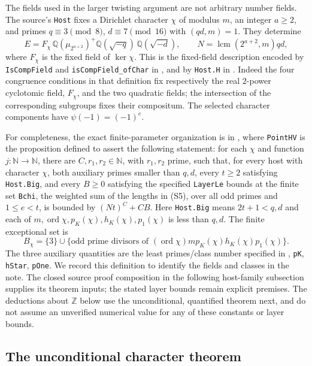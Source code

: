 \documentclass[11pt,a4paper]{article}
\theoremstyle{definition}
\begin{document}
The fields used in the larger twisting argument are not arbitrary number
fields. The source's \texttt{Host} fixes a Dirichlet character $\chi$ of
modulus $m$, an integer $a\ge2$, and primes $q\equiv3\pmod8$,
$d\equiv7\pmod{16}$ with $(qd,m)=1$. They determine
\[
 E=F_\chi\,\mathbb Q(\mu_{2^{a+2}})^+
      \mathbb Q(\sqrt{-q})\,\mathbb Q(\sqrt{-d}),
 \qquad N=\operatorname{lcm}(2^{a+2},m)qd,
 \tag{S6}
\]
where $F_\chi$ is the fixed field of $\ker\chi$. This is the fixed-field
description encoded by \texttt{IsCompField} and
\texttt{isCompField\_ofChar} in , and by
\texttt{Host.H} in
.
Indeed the four congruence conditions in that definition fix respectively
the real $2$-power cyclotomic field, $F_\chi$, and the two quadratic fields;
the intersection of the corresponding subgroups fixes their compositum.
The selected character components have $\psi(-1)=(-1)^e$.

For completeness, the exact finite-parameter organization is in
, where \texttt{PointHV}
is the proposition defined to assert the following statement:
for each $\chi$ and function $j:\mathbb N\to\mathbb N$, there are
$C,r_1,r_2\in\mathbb N$, with $r_1,r_2$ prime, such that, for every host
with character $\chi$, both auxiliary primes smaller than $q,d$, every
$t\ge2$ satisfying \texttt{Host.Big}, and every $B\ge0$ satisfying
the specified \texttt{LayerLe} bounds at the finite set \texttt{Bchi},
the weighted sum of the lengths in (S5), over all odd primes and
$1\le e<t$, is bounded by $(Nt)^C+CB$.
Here \texttt{Host.Big} means $2t+1<q,d$ and each of
$m,\operatorname{ord}\chi,p_K(\chi),h_K(\chi),p_1(\chi)$ is less than
$q,d$. The finite exceptional set is
\[
 B_\chi=\{3\}\cup
 \{\text{odd prime divisors of }
   (\operatorname{ord}\chi)m p_K(\chi)h_K(\chi)p_1(\chi)\}.
\]
The three auxiliary quantities are the least primes/class number specified
in , \texttt{pK}, \texttt{hStar}, \texttt{pOne}.
We record this definition to identify the fields and classes in the
note. The closed source proof composition in the following host-family
subsection supplies its theorem inputs; the stated layer bounds remain
explicit premises. The deductions about $\mathbb Z$ below use the unconditional,
quantified theorem next, and do not assume an unverified numerical value
for any of these constants or layer bounds.

\subsection{The unconditional character theorem}
\end{document}
